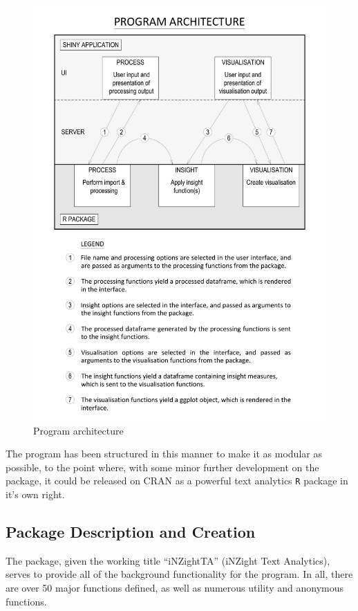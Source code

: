 \documentclass[11pt, a4paper, titlepage]{report}
\begin{document}
\begin{figure}
  \centering \includegraphics[scale=0.65]{arch-expanded.pdf}
  \caption{Program architecture\label{fig:pr-arch}}
\end{figure}

The program has been structured in this manner to make it as modular
as possible, to the point where, with some minor further development
on the package, it could be released on CRAN as a powerful text
analytics \texttt{R} package in it's own right.

\subsection{Package Description and Creation}

The package, given the working title ``iNZightTA'' (iNZight Text
Analytics), serves to provide all of the background functionality for
the program. In all, there are over 50 major functions defined, as
well as numerous utility and anonymous functions.
\end{document}
